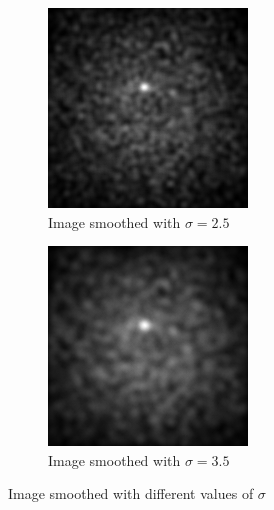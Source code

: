 \documentclass[a4paper,12pt,oneside]{book}
\begin{document}
\begin{onehalfspace}
\begin{figure}
\begin{subfigure}{.3\textwidth}
		\includegraphics[width=\linewidth]{smooth5}
		\caption{Image smoothed with $\sigma=2.5$}
		\label{fig:smooth5}
	\end{subfigure}
	\begin{subfigure}{.3\textwidth}
		\centering
		\includegraphics[width=\linewidth]{smooth7}
		\caption{Image smoothed with $\sigma=3.5$}
		\label{fig:smooth7}
	\end{subfigure}
	\caption{Image smoothed with different values of $\sigma$}
	\label{fig:smoothed}
	\end{figure} 
	

\end{onehalfspace}
\end{document}
